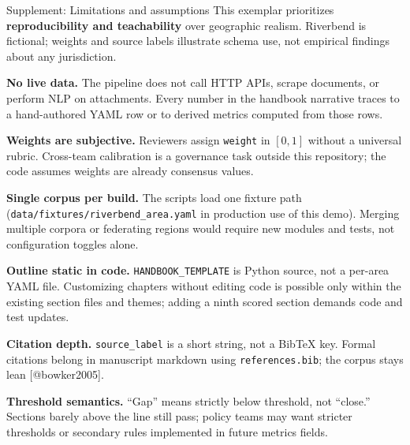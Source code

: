 \documentclass[
  ignorenonframetext,
]{beamer}
\author{\texorpdfstring{}{}}
\date{}
\begin{document}
\begin{frame}[fragile]{Supplement: Limitations and assumptions}
\protect{}\label{supplement-limitations-and-assumptions}
This exemplar prioritizes \textbf{reproducibility and teachability} over
geographic realism. Riverbend is fictional; weights and source labels
illustrate schema use, not empirical findings about any jurisdiction.

\textbf{No live data.} The pipeline does not call HTTP APIs, scrape
documents, or perform NLP on attachments. Every number in the handbook
narrative traces to a hand-authored YAML row or to derived metrics
computed from those rows.

\textbf{Weights are subjective.} Reviewers assign \texttt{weight} in
\([0,1]\) without a universal rubric. Cross-team calibration is a
governance task outside this repository; the code assumes weights are
already consensus values.

\textbf{Single corpus per build.} The scripts load one fixture path
(\texttt{data/fixtures/riverbend\_area.yaml} in production use of this
demo). Merging multiple corpora or federating regions would require new
modules and tests, not configuration toggles alone.

\textbf{Outline static in code.} \texttt{HANDBOOK\_TEMPLATE} is Python
source, not a per-area YAML file. Customizing chapters without editing
code is possible only within the existing section files and themes;
adding a ninth scored section demands code and test updates.

\textbf{Citation depth.} \texttt{source\_label} is a short string, not a
BibTeX key. Formal citations belong in manuscript markdown using
\texttt{references.bib}; the corpus stays lean {[}@bowker2005{]}.

\textbf{Threshold semantics.} ``Gap'' means strictly below threshold,
not ``close.'' Sections barely above the line still pass; policy teams
may want stricter thresholds or secondary rules implemented in future
metrics fields.
\end{frame}
\end{document}
